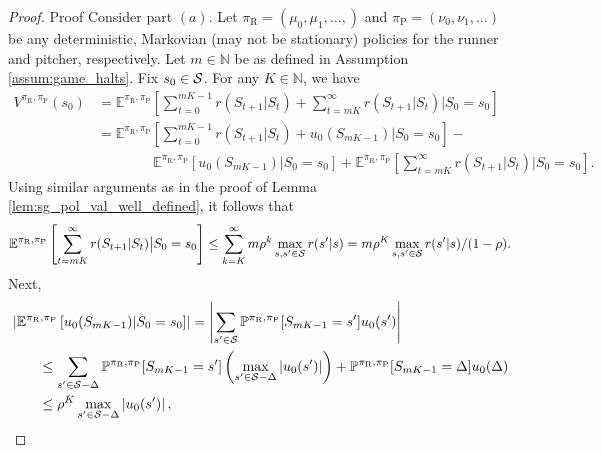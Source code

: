 \documentclass[aoas]{imsart}
\theoremstyle{plain}
\theoremstyle{definition}
\newcommand{\abs}[1]{\left\lvert#1\right\rvert}
\begin{document}
       \begin{proof}{Proof}       
           Consider part $(a)$.  Let $\pi_\text{R} = (\mu_0,\mu_1,\ldots,)$ and $\pi_\text{P} = (\nu_0,\nu_1,\ldots)$ be any  deterministic, Markovian (may not be stationary) policies for the runner and pitcher, respectively. Let $m \in \mathbb{N}$ be as defined in Assumption \ref{assum:game_halts}. Fix $s_0 \in {\cal S}$. For any $K \in \mathbb{N}$, we have
           \begingroup
           \allowdisplaybreaks
           \begin{align}
           \nonumber
               V^{\pi_\text{R},\pi_\text{P}}(s_0) &= \mathbb{E}^{\pi_\text{R},\pi_\text{P}}\left[\sum_{t=0}^{mK-1} r(S_{t+1}|S_t) + \sum_{t=mK}^\infty r(S_{t+1}|S_t) \Big| S_0 = s_0\right]\\
               \nonumber
               &= \mathbb{E}^{\pi_\text{R},\pi_\text{P}}\left[\sum_{t=0}^{mK-1} r(S_{t+1}|S_t) + u_0(S_{mK-1}) \Big| S_0 = s_0\right] -\\           \label{eqn:vi_convergence_temp1}
               &\qquad \qquad \mathbb{E}^{\pi_\text{R},\pi_\text{P}}\left[ u_0(S_{mK-1})\Big| S_0 = s_0\right] + \mathbb{E}^{\pi_\text{R},\pi_\text{P}}\left[\sum_{t=mK}^\infty r(S_{t+1}|S_t) \Big| S_0 = s_0\right].
           \end{align}
           \endgroup
           Using similar arguments as in the proof of Lemma \ref{lem:sg_pol_val_well_defined}, it follows that
           \begin{equation}      \label{eqn:vi_convergence_temp2}    \mathbb{E}^{\pi_\text{R},\pi_\text{P}}\left[\sum_{t=mK}^\infty r(S_{t+1}|S_t) \big| S_0 = s_0\right] \leq \sum_{k=K}^\infty m \rho^k \max_{s,s' \in {\cal S}}r(s'|s) = m\rho^K\max_{s,s' \in {\cal S}}r(s'|s)/(1-\rho).
           \end{equation}
           Next, 
           \begin{align}
               \nonumber
               &\abs{\mathbb{E}^{\pi_\text{R},\pi_\text{P}}\left[ u_0(S_{mK-1}) \vert S_0 = s_0\right]} = \abs{\sum_{s' \in {\cal S}}\mathbb{P}^{\pi_\text{R},\pi_\text{P}}[S_{mK-1}=s']u_0(s')}\\
               \nonumber
               &\qquad \leq \sum_{s' \in {\cal S}-\Delta}\mathbb{P}^{\pi_\text{R},\pi_\text{P}}[S_{mK-1}=s'] \left(\max_{s' \in {\cal S}-\Delta}\abs{u_0(s')}\right) + \mathbb{P}^{\pi_\text{R},\pi_\text{P}}[S_{mK-1}=\Delta]u_0(\Delta)\\
               \label{eqn:vi_convergence_temp3}
               &\qquad \leq \rho^K \max_{s' \in {\cal S}-\Delta}\abs{u_0(s')},

\end{align}
\end{proof}
\end{document}

